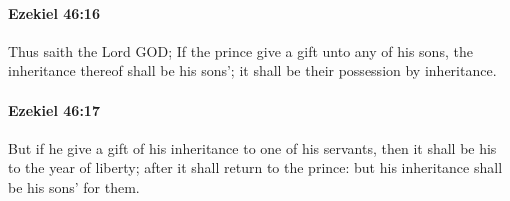 		\paragraph{Ezekiel 46:16} %
			\label{EZEKIEL-46-16}

			Thus saith the Lord GOD; If the prince give a gift unto any of his sons, the inheritance thereof shall be his sons’; it shall be their possession by inheritance.


		\paragraph{Ezekiel 46:17} %
			\label{EZEKIEL-46-17}

			But if he give a gift of his inheritance to one of his servants, then it shall be his to the year of liberty; after it shall return to the prince: but his inheritance shall be his sons’ for them.


